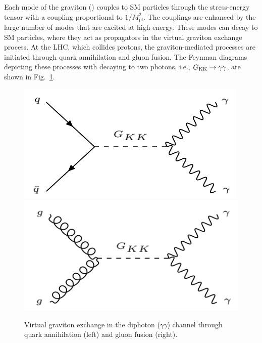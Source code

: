 Each \KK mode of the graviton (\Gkk) couples to SM particles through the stress-energy tensor with a coupling proportional to $1/M_{\mathrm{pl}}^2$. The couplings are enhanced by the large number of modes that are excited at high energy. These \Gkk modes can decay to SM particles, where they act as propagators in the virtual graviton exchange process. At the LHC, which collides protons, the graviton-mediated processes are initiated through quark annihilation and gluon fusion. The Feynman diagrams depicting these processes with \Gkk decaying to two photons, i.e., $G_{\rm KK} \to \gamma\gamma$, are shown in Fig.~\ref{signal_diagrams}.

\begin{figure}[!htb]
	\centering
	\includegraphics[scale=0.45]{figures/qqToGrav}
	\includegraphics[scale=0.45]{figures/ggToGrav}
	\caption{Virtual graviton exchange in the diphoton ($\gamma\gamma$) channel through quark annihilation (left) and gluon fusion (right).}
	\label{signal_diagrams}
\end{figure}

